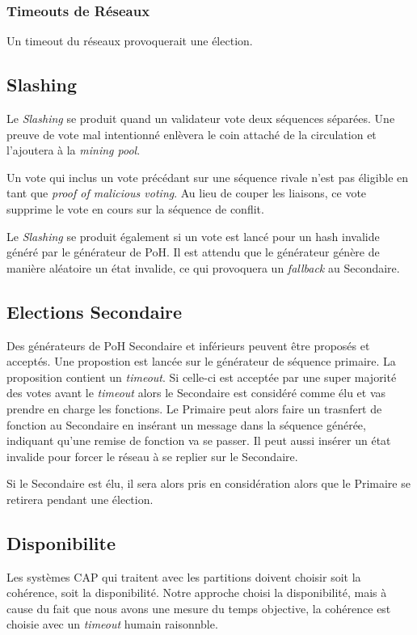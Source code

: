 \documentclass[12pt]{article}
\begin{document}
\subsubsection{Timeouts de Réseaux}

Un timeout du réseaux provoquerait une élection.

\subsection{Slashing}

Le \textit{Slashing} se produit quand un validateur vote deux séquences séparées. Une preuve de vote mal intentionné enlèvera le coin attaché de la circulation et l'ajoutera à la \textit{mining pool}.

Un vote qui inclus un vote précédant sur une séquence rivale n'est pas éligible en tant que \textit{proof of malicious voting}. Au lieu de couper les liaisons, ce vote supprime le vote en cours sur la séquence de conflit.

Le \textit{Slashing} se produit également si un vote est lancé pour un hash invalide généré par le générateur de PoH. Il est attendu que le générateur génère de manière aléatoire un état invalide, ce qui provoquera un \textit{fallback} au Secondaire.

\subsection{Elections Secondaire}
Des générateurs de PoH Secondaire et inférieurs peuvent être proposés et acceptés. Une propostion est lancée sur le générateur de séquence primaire. La proposition contient un \textit{timeout}. Si celle-ci est acceptée par une super majorité des votes avant le \textit{timeout} alors le Secondaire est considéré comme élu et vas prendre en charge les fonctions. Le Primaire peut alors faire un trasnfert de fonction au Secondaire en insérant un message dans la séquence générée, indiquant qu'une remise de fonction va se passer. Il peut aussi insérer un état invalide pour forcer le réseau à se replier sur le Secondaire.

Si le Secondaire est élu, il sera alors pris en considération alors que le Primaire se retirera pendant une élection.

\subsection{Disponibilite}\label{disponibility}
Les systèmes CAP qui traitent avec les partitions doivent choisir soit la cohérence, soit la disponibilité. Notre approche choisi la disponibilité, mais à cause du fait que nous avons une mesure du temps objective, la cohérence est choisie avec un \textit{timeout} humain raisonnble.
\end{document}

